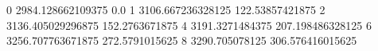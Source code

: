 0 2984.128662109375 0.0
1 3106.667236328125 122.53857421875
2 3136.405029296875 152.2763671875
4 3191.3271484375 207.198486328125
6 3256.707763671875 272.5791015625
8 3290.705078125 306.576416015625
